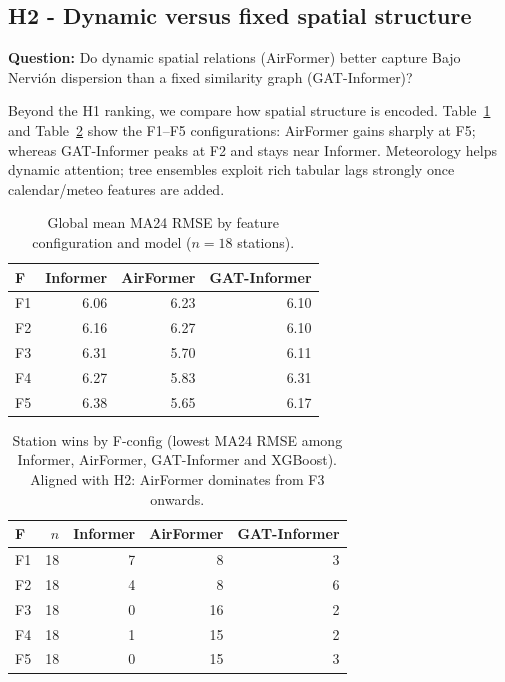 \documentclass[11pt]{article}
\begin{document}
\subsection{H2 - Dynamic versus fixed spatial structure}
\label{sec:results-h2}
\label{sec:results-gat-variants}
\label{sec:results-ablation-f}

\textbf{Question:} Do dynamic spatial relations (AirFormer) better capture Bajo Nervi\'on dispersion than a fixed similarity graph (GAT-Informer)?

Beyond the H1 ranking, we compare how spatial structure is encoded. Table~\ref{tab:global-mean-f} and Table~\ref{tab:wins-f} show the F1--F5 configurations: AirFormer gains sharply at F5; whereas GAT-Informer peaks at F2 and stays near Informer. Meteorology helps dynamic attention; tree ensembles exploit rich tabular lags strongly once calendar/meteo features are added.

\begin{table}[ht]
\centering
\caption{Global mean MA24 RMSE by feature configuration and model ($n{=}18$ stations).}
\label{tab:global-mean-f}
\footnotesize
\begin{tabular}{@{}lrrr@{}}
\toprule
F & Informer & AirFormer & GAT-Informer \\
\midrule
F1 & 6.06 & 6.23 & 6.10 \\
F2 & 6.16 & 6.27 & 6.10 \\
F3 & 6.31 & 5.70 & 6.11 \\
F4 & 6.27 & 5.83 & 6.31 \\
F5 & 6.38 & 5.65 & 6.17 \\
\bottomrule
\end{tabular}
\end{table}

\begin{table}[ht]
\centering
\caption{Station wins by F-config (lowest MA24 RMSE among Informer, AirFormer, GAT-Informer and XGBoost). Aligned with H2: AirFormer dominates from F3 onwards.}
\label{tab:wins-f}
\footnotesize
\begin{tabular}{@{}lrrrr@{}}
\toprule
F & $n$ & Informer & AirFormer & GAT-Informer \\
\midrule
F1 & 18 & 7 & 8 & 3 \\
F2 & 18 & 4 & 8 & 6 \\
F3 & 18 & 0 & 16 & 2 \\
F4 & 18 & 1 & 15 & 2 \\
F5 & 18 & 0 & 15 & 3 \\
\bottomrule
\end{tabular}
\end{table}
\end{document}
